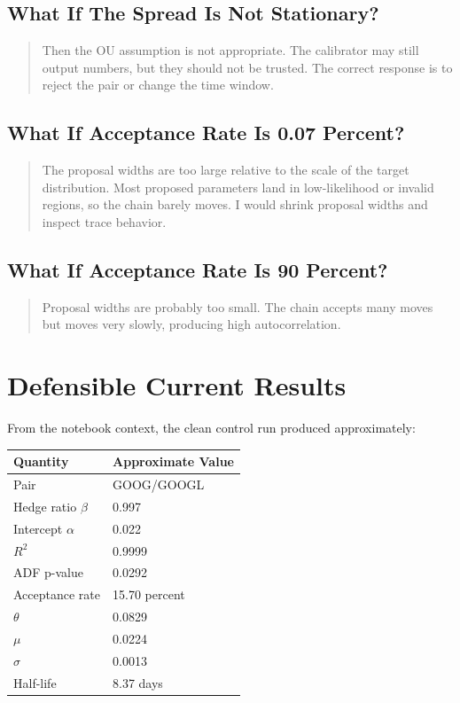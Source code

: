 \documentclass[11pt]{article}
\begin{document}
\subsection{What If The Spread Is Not Stationary?}

\begin{quote}
Then the OU assumption is not appropriate. The calibrator may still output
numbers, but they should not be trusted. The correct response is to reject the
pair or change the time window.
\end{quote}

\subsection{What If Acceptance Rate Is 0.07 Percent?}

\begin{quote}
The proposal widths are too large relative to the scale of the target
distribution. Most proposed parameters land in low-likelihood or invalid
regions, so the chain barely moves. I would shrink proposal widths and inspect
trace behavior.
\end{quote}

\subsection{What If Acceptance Rate Is 90 Percent?}

\begin{quote}
Proposal widths are probably too small. The chain accepts many moves but moves
very slowly, producing high autocorrelation.
\end{quote}

\section{Defensible Current Results}

From the notebook context, the clean control run produced approximately:

\begin{center}
\begin{tabular}{ll}
\toprule
\textbf{Quantity} & \textbf{Approximate Value}\\
\midrule
Pair & GOOG/GOOGL\\
Hedge ratio $\beta$ & 0.997\\
Intercept $\alpha$ & 0.022\\
$R^2$ & 0.9999\\
ADF p-value & 0.0292\\
Acceptance rate & 15.70 percent\\
$\theta$ & 0.0829\\
$\mu$ & 0.0224\\
$\sigma$ & 0.0013\\
Half-life & 8.37 days\\
\bottomrule
\end{tabular}
\end{center}
\end{document}
